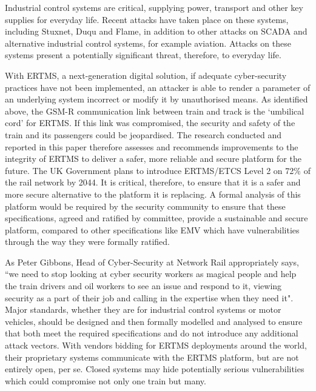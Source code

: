 \documentclass[twoside,11pt,a4paper]{article}
\begin{document}
Industrial control systems are critical, supplying power, transport and other key supplies for everyday life. Recent attacks have taken place on these systems, including Stuxnet, Duqu and Flame, in addition to other attacks on SCADA and alternative industrial control systems, for example aviation. Attacks on these systems present a potentially significant threat, therefore, to everyday life.

With ERTMS, a next-generation digital solution, if adequate cyber-security practices have not been implemented, an attacker is able to render a parameter of an underlying system incorrect or modify it by unauthorised means. As identified above, the GSM-R communication link between train and track is the `umbilical cord' for ERTMS. If this link was compromised, the security and safety of the train and its passengers could be jeopardised. The research conducted and reported in this paper therefore assesses and recommends improvements to the integrity of ERTMS to deliver a safer, more reliable and secure platform for the future. The UK Government plans to introduce ERTMS/ETCS Level 2 on 72\% of the rail network by 2044. It is critical, therefore, to ensure that it is a safer and more secure alternative to the platform it is replacing. A formal analysis of this platform would be required by the security community to ensure that these specifications, agreed and ratified by committee, provide a sustainable and secure platform, compared to other specifications like EMV which have vulnerabilities through the way they were formally ratified.

As Peter Gibbons, Head of Cyber-Security at Network Rail appropriately says, ``we need to stop looking at cyber security workers as magical people and help the train drivers and oil workers to see an issue and respond to it, viewing security as a part of their job and calling in the expertise when they need it"\citep{V315a}. Major standards, whether they are for industrial control systems or motor vehicles, should be designed and then formally modelled and analysed to ensure that both meet the required specifications and do not introduce any additional attack vectors. With vendors bidding for ERTMS deployments around the world, their proprietary systems communicate with the ERTMS platform, but are not entirely open, per se. Closed systems may hide potentially serious vulnerabilities which could compromise not only one train but many.
\end{document}
